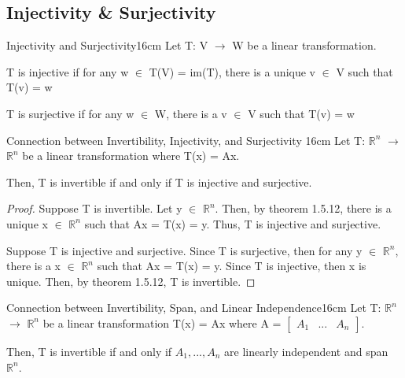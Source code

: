 \subsection{ Injectivity \& Surjectivity }

    \begin{definition}{Injectivity and Surjectivity}{16cm}
        Let T: V $\rightarrow$ W be a linear transformation.

        T is {\color{lblue} injective} if for any w $\in$ T(V) = im(T),
        there is a unique v $\in$ V such that T(v) = w

        T is {\color{lblue} surjective} if for any w $\in$ W,
        there is a v $\in$ V such that T(v) = w
    \end{definition}

    \vspace{0.5cm}



    \begin{wtheorem}{Connection between Invertibility, Injectivity,
    and Surjectivity }{16cm}
        Let T: $\mathbb{R}^n$ $\rightarrow$ $\mathbb{R}^n$
        be a linear transformation where T(x) = Ax.
        
        Then, T is invertible if and only if T is injective and surjective.
    \end{wtheorem}

    \begin{proof}
        Suppose T is invertible.
        Let y $\in$ $\mathbb{R}^n$.
        Then, by {\color{red} theorem 1.5.12},
        there is a unique x $\in$ $\mathbb{R}^n$ such that Ax = T(x) = y.
        Thus, T is injective and surjective.

        \vspace{0.2cm}

        Suppose T is injective and surjective.
        Since T is surjective, then for any y $\in$ $\mathbb{R}^n$,
        there is a x $\in$ $\mathbb{R}^n$ such that Ax = T(x) = y.
        Since T is injective, then x is unique.
        Then, by {\color{red} theorem 1.5.12}, T is invertible.
    \end{proof}

    \vspace{0.5cm}



    \begin{wtheorem}{Connection between Invertibility, Span, and
    Linear Independence}{16cm}
        Let T: $\mathbb{R}^n$ $\rightarrow$ $\mathbb{R}^n$
        be a linear transformation T(x) = Ax where A =
        $\begin{bmatrix}
            A_1 & ... & A_n
        \end{bmatrix}$.

        Then, T is invertible if and only if $A_1,...,A_n$
        are linearly independent and span $\mathbb{R}^n$.
    \end{wtheorem}

